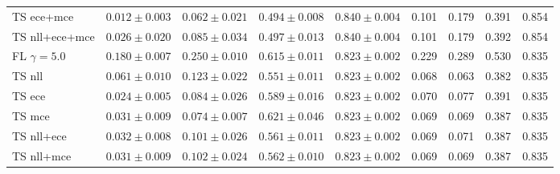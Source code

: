 \begin{table}[h!]
{\begin{tabular}{l|cccc|m{0.8cm}m{0.8cm}m{0.8cm}m{0.8cm}|}
			TS ece+mce & \multicolumn{1}{c|}{$0.012 \pm 0.003$}& \multicolumn{1}{c|}{$0.062 \pm 0.021$}& \multicolumn{1}{c|}{$0.494 \pm 0.008$}& \multicolumn{1}{c|}{$0.840 \pm 0.004$}& \multicolumn{1}{c|}{0.101} & \multicolumn{1}{c|}{0.179} & \multicolumn{1}{c|}{0.391} & \multicolumn{1}{c|}{0.854} \\
			TS nll+ece+mce & \multicolumn{1}{c|}{$0.026 \pm 0.020$}& \multicolumn{1}{c|}{$0.085 \pm 0.034$}& \multicolumn{1}{c|}{$0.497 \pm 0.013$}& \multicolumn{1}{c|}{$0.840 \pm 0.004$}& \multicolumn{1}{c|}{0.101} & \multicolumn{1}{c|}{0.179} & \multicolumn{1}{c|}{0.392} & \multicolumn{1}{c|}{0.854} \\ \hline \hline
			FL $\gamma=5.0$ & \multicolumn{1}{c|}{$0.180 \pm 0.007$}& \multicolumn{1}{c|}{$0.250 \pm 0.010$}& \multicolumn{1}{c|}{$0.615 \pm 0.011$}& \multicolumn{1}{c|}{$0.823 \pm 0.002$}& \multicolumn{1}{c|}{0.229} & \multicolumn{1}{c|}{0.289} & \multicolumn{1}{c|}{0.530} & \multicolumn{1}{c|}{0.835} \\
			TS nll & \multicolumn{1}{c|}{$0.061 \pm 0.010$}& \multicolumn{1}{c|}{$0.123 \pm 0.022$}& \multicolumn{1}{c|}{$0.551 \pm 0.011$}& \multicolumn{1}{c|}{$0.823 \pm 0.002$}& \multicolumn{1}{c|}{0.068} & \multicolumn{1}{c|}{0.063} & \multicolumn{1}{c|}{0.382} & \multicolumn{1}{c|}{0.835} \\
			TS ece & \multicolumn{1}{c|}{$0.024 \pm 0.005$}& \multicolumn{1}{c|}{$0.084 \pm 0.026$}& \multicolumn{1}{c|}{$0.589 \pm 0.016$}& \multicolumn{1}{c|}{$0.823 \pm 0.002$}& \multicolumn{1}{c|}{0.070} & \multicolumn{1}{c|}{0.077} & \multicolumn{1}{c|}{0.391} & \multicolumn{1}{c|}{0.835} \\
			TS mce & \multicolumn{1}{c|}{$0.031 \pm 0.009$}& \multicolumn{1}{c|}{$0.074 \pm 0.007$}& \multicolumn{1}{c|}{$0.621 \pm 0.046$}& \multicolumn{1}{c|}{$0.823 \pm 0.002$}& \multicolumn{1}{c|}{0.069} & \multicolumn{1}{c|}{0.069} & \multicolumn{1}{c|}{0.387} & \multicolumn{1}{c|}{0.835} \\
			TS nll+ece & \multicolumn{1}{c|}{$0.032 \pm 0.008$}& \multicolumn{1}{c|}{$0.101 \pm 0.026$}& \multicolumn{1}{c|}{$0.561 \pm 0.011$}& \multicolumn{1}{c|}{$0.823 \pm 0.002$}& \multicolumn{1}{c|}{0.069} & \multicolumn{1}{c|}{0.071} & \multicolumn{1}{c|}{0.387} & \multicolumn{1}{c|}{0.835} \\
			TS nll+mce & \multicolumn{1}{c|}{$0.031 \pm 0.009$}& \multicolumn{1}{c|}{$0.102 \pm 0.024$}& \multicolumn{1}{c|}{$0.562 \pm 0.010$}& \multicolumn{1}{c|}{$0.823 \pm 0.002$}& \multicolumn{1}{c|}{0.069} & \multicolumn{1}{c|}{0.069} & \multicolumn{1}{c|}{0.387} & \multicolumn{1}{c|}{0.835} \\

\end{tabular}}
\end{table}
